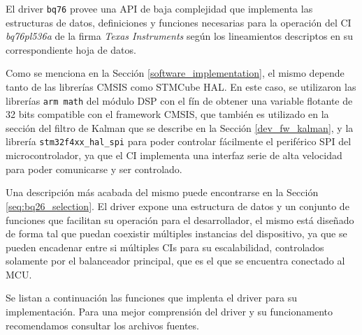 \documentclass[10pt, a4paper]{report}
\begin{document}
El driver \texttt{bq76} provee una \acrshort{API} de baja complejidad que
implementa las estructuras de datos, definiciones y funciones necesarias para la
operación del \acrshort{CI} \emph{bq76pl536a} de la firma \emph{Texas
Instruments} según los lineamientos descriptos en su correspondiente hoja de
datos. 

Como se menciona en la Secci\'on \ref{software_implementation}, el mismo
depende tanto de las librer\'ias \acrshort{CMSIS} como STMCube \acrshort{HAL}.
En este caso, se utilizaron las librer\'ias \texttt{arm math} del m\'odulo
\acrshort{DSP} con el fín de obtener una variable flotante de 32 bits compatible
con el framework \acrshort{CMSIS}, que tambi\'en es utilizado en la secci\'on del
filtro de Kalman que se describe en la Secci\'on \ref{dev_fw_kalman}, y la 
librería \texttt{stm32f4xx\_hal\_spi} para poder controlar f\'acilmente el 
periférico \acrshort{SPI} del microcontrolador, ya que el \acrshort{CI}
implementa una interfaz serie de alta velocidad para poder comunicarse y ser
controlado.

Una descripción más acabada del mismo puede encontrarse en la Sección 
\ref{seq:bq26_selection}. El driver expone una estructura de datos y un conjunto
de funciones que facilitan su operaci\'on para el desarrollador, el mismo est\'a
diseñado de forma tal que puedan coexistir m\'ultiples instancias del
dispositivo, ya que se pueden encadenar entre si m\'ultiples \acrshort{CI}s para
su escalabilidad, controlados solamente por el balanceador principal, que es el
que se encuentra conectado al \acrshort{MCU}.

Se listan a continuación las funciones que implenta el driver para su
implementaci\'on. Para una mejor comprensión del driver y su funcionamento 
recomendamos consultar los archivos fuentes.
\end{document}
